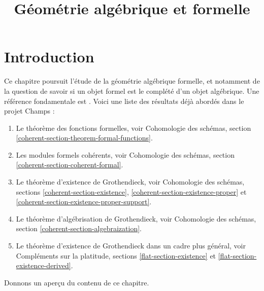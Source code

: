 

%


\title{Géométrie algébrique et formelle}


\maketitle

\label{section-phantom}

\tableofcontents

\section{Introduction}
\label{section-introduction}

\noindent
Ce chapitre poursuit l'étude de la géométrie algébrique formelle,
et notamment de la question de savoir si un objet formel est
le complété d'un objet algébrique. Une référence fondamentale est \cite{SGA2}.
Voici une liste des résultats déjà abordés
dans le projet Champs :
\begin{enumerate}
\item Le théorème des fonctions formelles, voir
Cohomologie des schémas, section \ref{coherent-section-theorem-formal-functions}.
\item Les modules formels cohérents, voir
Cohomologie des schémas, section \ref{coherent-section-coherent-formal}.
\item Le théorème d'existence de Grothendieck, voir
Cohomologie des schémas, sections \ref{coherent-section-existence},
\ref{coherent-section-existence-proper} et
\ref{coherent-section-existence-proper-support}.
\item Le théorème d'algébrisation de Grothendieck, voir
Cohomologie des schémas, section \ref{coherent-section-algebraization}.
\item Le théorème d'existence de Grothendieck dans un cadre plus général, voir
Compléments sur la platitude, sections \ref{flat-section-existence} et
\ref{flat-section-existence-derived}.
\end{enumerate}
Donnons un aperçu du contenu de ce chapitre.

